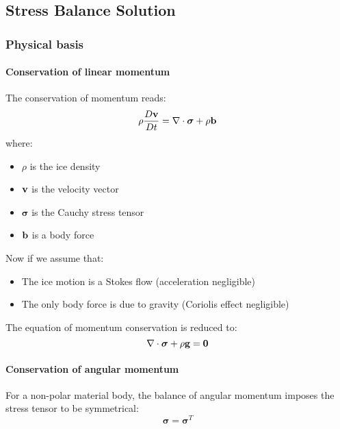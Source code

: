 
\subsection{Stress Balance Solution} \label{sec:using-issm-capabilities-stress-balance}

\subsubsection{Physical basis}
\paragraph{Conservation of linear momentum}
The conservation of momentum reads:
\begin{equation}
	\rho \frac{D {\bf v} }{Dt} = \nabla \cdot {\boldsymbol{\sigma}} + \rho {\bf b}
\end{equation}
where:
\begin{itemize}
	\item $\rho$ is the ice density
	\item ${\bf v}$ is the velocity vector
	\item $\boldsymbol{\sigma}$ is the Cauchy stress tensor
	\item ${\bf b}$ is a body force
\end{itemize}
Now if we assume that:
\begin{itemize}
	\item The ice motion is a Stokes flow (acceleration negligible)
	\item The only body force is due to gravity (Coriolis effect negligible)
\end{itemize}
The equation of momentum conservation is reduced to:
\begin{equation}
	\nabla \cdot \boldsymbol{\sigma} + \rho {\bf g} = {\bf 0}
\end{equation}
\paragraph{Conservation of angular momentum}
For a non-polar material body, the balance of angular momentum imposes the stress tensor to be symmetrical:
\begin{equation}
	\boldsymbol{\sigma} = \boldsymbol{\sigma}^T
\end{equation}
